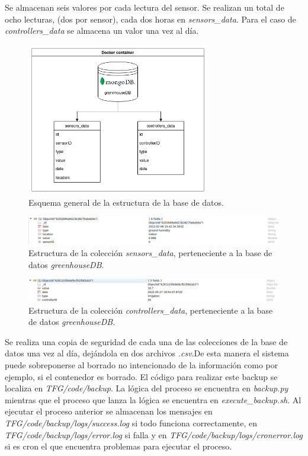 \documentclass[a4paper, 12pt, oneside]{book}
\begin{document}
Se almacenan seis valores por cada lectura del sensor. Se realizan un total de ocho lecturas, (dos por sensor), cada dos horas en \textit{sensors\_data}. Para el caso de \textit{controllers\_data} se almacena un valor una vez al día.
\begin{figure}[H]
	\centering
    \includegraphics[width=8cm, keepaspectratio]{img/estructura_db}
    \caption{Esquema general de la estructura de la base de datos.}
    \label{figura:estructura_bd}
\end{figure}
\begin{figure}[H]
	\centering
    \includegraphics[width=15cm, keepaspectratio]{img/sensors_data_collection}
    \caption{Estructura de la colección \textit{sensors\_data}, perteneciente a la base de datos \textit{greenhouseDB}.}
    \label{figura:sensors data collection}
\end{figure}
\begin{figure}[H]
	\centering
    \includegraphics[width=15cm, keepaspectratio]{img/controllers_data_collection}
    \caption{Estructura de la colección \textit{controllers\_data}, perteneciente a la base de datos \textit{greenhouseDB}.}
    \label{figura:controllers data collection}
\end{figure}


Se realiza una copia de seguridad de cada una de las colecciones de la base de datos una vez al día, dejándola en dos archivos \textit{.csv}.De esta manera el sistema puede sobreponerse al borrado no intencionado de la información como por ejemplo,  si el contenedor es borrado.
El código para realizar este backup se localiza en \textit{TFG/code/backup}. La lógica del proceso se encuentra en \textit{backup.py} mientras que el proceso que lanza la lógica se encuentra en \textit{execute\_backup.sh}. 
Al ejecutar el proceso anterior se almacenan los mensajes en \textit{TFG/code/backup/logs/success.log} si todo funciona correctamente, en \textit{TFG/code/backup/logs/error.log} si falla y en \textit{TFG/code/backup/logs/cronerror.log} si es cron el que encuentra problemas para ejecutar el proceso.
\end{document}
